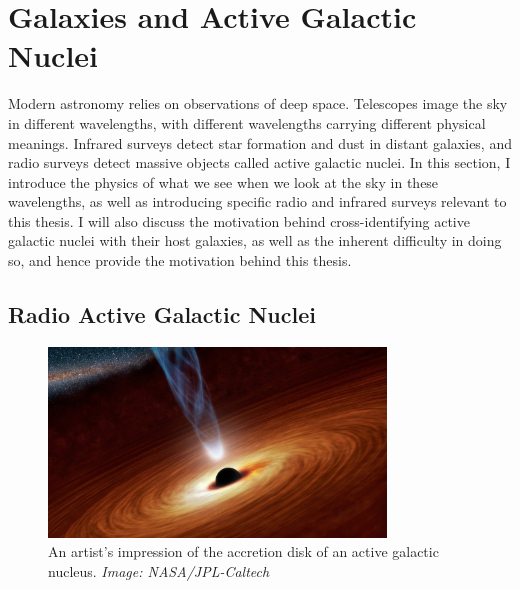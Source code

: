 \chapter{Galaxies and Active Galactic Nuclei}
\label{cha:astro}

    Modern astronomy relies on observations of deep space. Telescopes image the
    sky in different wavelengths, with different wavelengths carrying different
    physical meanings. Infrared surveys detect star formation and dust in
    distant galaxies, and radio surveys detect massive objects called active
    galactic nuclei. In this section, I introduce the physics of what we see
    when we look at the sky in these wavelengths, as well as introducing
    specific radio and infrared surveys relevant to this thesis. I will also
    discuss the motivation behind cross-identifying active galactic nuclei with
    their host galaxies, as well as the inherent difficulty in doing so, and
    hence provide the motivation behind this thesis.




    \section{Radio Active Galactic Nuclei}
    \label{sec:agns}

        \begin{figure}[!ht]
            \centering
            \includegraphics[width=0.8\textwidth]{images/accretion_disk_artist_impression.jpg}
            \caption{An artist's impression of the accretion disk of an active galactic nucleus. \emph{Image: NASA/JPL-Caltech}}
            \label{fig:accretion-disk}
        \end{figure}


